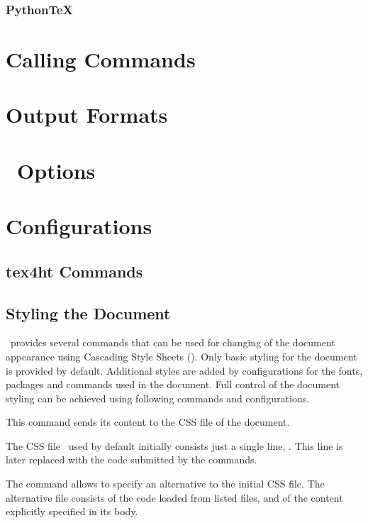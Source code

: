 \documentclass{book}
\begin{document}
\subsection{PythonTeX}


\chapter{Calling Commands}

\label{sec:calling-commands}
\chapter{Output Formats}
\chapter{\texfourht\ Options}



\chapter{Configurations}

\section{tex4ht Commands}

\section{Styling the Document}

\texfourht\ provides several commands that can be used for changing of the
document appearance using Cascading Style Sheets (\css). Only basic styling for
the document is provided by default. Additional styles are added by configurations for the
fonts, packages and commands used in the document. Full control of the document
styling can be achieved using following commands and configurations.



This command sends its content to the CSS file of the document. 


The CSS file \texfourht\ used by default initially consists just
a single line,  . This line is later
replaced with the code submitted by the  commands.

The \texcommand{\CssFile} command allows to specify an alternative to the initial CSS file.
The alternative file consists of the code loaded from listed files, and of the
content explicitly specified in its body.
\end{document}
